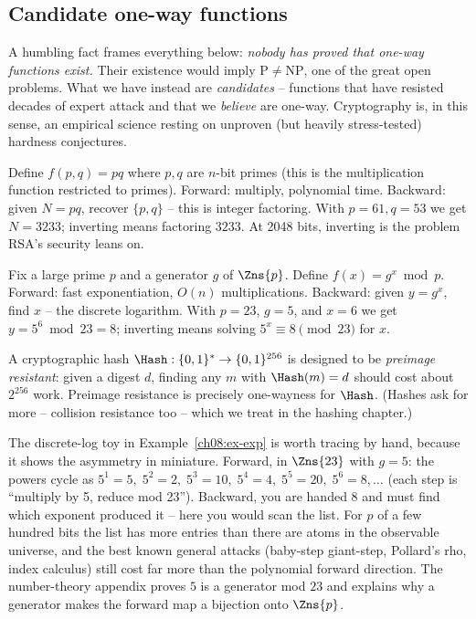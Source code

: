 \subsection{Candidate one-way functions}
\label{ch08:candidates}

A humbling fact frames everything below: \emph{nobody has proved that one-way functions exist.} Their existence would imply $\mathrm P \ne \mathrm{NP}$, one of the great open problems. What we have instead are \emph{candidates} -- functions that have resisted decades of expert attack and that we \emph{believe} are one-way. Cryptography is, in this sense, an empirical science resting on unproven (but heavily stress-tested) hardness conjectures.

\begin{example}
\label{ch08:ex-mult}
Define $f(p,q) = pq$ where $p,q$ are $n$-bit primes (this is the multiplication function restricted to primes). Forward: multiply, polynomial time. Backward: given $N=pq$, recover $\{p,q\}$ -- this is integer factoring. With $p=61, q=53$ we get $N=3233$; inverting means factoring $3233$. At 2048 bits, inverting is the problem RSA's security leans on.
\end{example}

\begin{example}
\label{ch08:ex-exp}
Fix a large prime $p$ and a generator $g$ of $\Zns{p}$. Define $f(x) = g^{x} \bmod p$. Forward: fast exponentiation, $O(n)$ multiplications. Backward: given $y=g^x$, find $x$ -- the discrete logarithm. With $p=23$, $g=5$, and $x=6$ we get $y = 5^6 \bmod 23 = 8$; inverting means solving $5^{x}\equiv 8 \pmod{23}$ for $x$.
\end{example}

\begin{example}
\label{ch08:ex-hash}
A cryptographic hash $\Hash:\{0,1\}^{*}\to\{0,1\}^{256}$ is designed to be \emph{preimage resistant}: given a digest $d$, finding any $m$ with $\Hash(m)=d$ should cost about $2^{256}$ work. Preimage resistance is precisely one-wayness for $\Hash$. (Hashes ask for more -- collision resistance too -- which we treat in the hashing chapter.)
\end{example}

\begin{connectionbox}
The discrete-log toy in Example~\ref{ch08:ex-exp} is worth tracing by hand, because it shows the asymmetry in miniature. Forward, in $\Zns{23}$ with $g=5$: the powers cycle as $5^1{=}5,\;5^2{=}2,\;5^3{=}10,\;5^4{=}4,\;5^5{=}20,\;5^6{=}8,\dots$ (each step is ``multiply by 5, reduce mod 23''). Backward, you are handed $8$ and must find which exponent produced it -- here you would scan the list. For $p$ of a few hundred bits the list has more entries than there are atoms in the observable universe, and the best known general attacks (baby-step giant-step, Pollard's rho, index calculus) still cost far more than the polynomial forward direction. The number-theory appendix proves $5$ is a generator mod $23$ and explains why a generator makes the forward map a bijection onto $\Zns{p}$.
\end{connectionbox}

